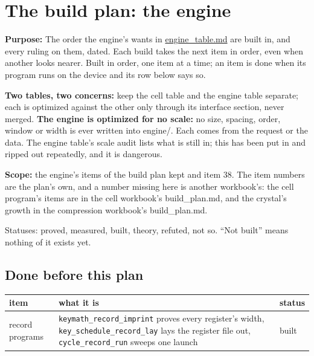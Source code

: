 \chapter{\texorpdfstring{The build plan: the engine}{The build plan: the engine}}
\label{chap:build-plan}

\textbf{Purpose:} The order the engine's wants in \hyperref[chap:engine-table]{engine\_\allowbreak{}table.md} are built in, and every ruling on them, dated. Each build takes the next item in order, even when another looks nearer. Built in order, one item at a time; an item is done when its program runs on the device and its row below says so.

\textbf{Two tables, two concerns:} keep the cell table and the engine table separate; each is optimized against the other only through its interface section, never merged. \textbf{The engine is optimized for no scale:} no size, spacing, order, window or width is ever written into engine/. Each comes from the request or the data. The engine table's scale audit lists what is still in; this has been put in and ripped out repeatedly, and it is dangerous.

\textbf{Scope:} the engine's items of the build plan kept and item 38. The item numbers are the plan's own, and a number missing here is another workbook's: the cell program's items are in the cell workbook's build\_\allowbreak{}plan.md, and the crystal's growth in the compression workbook's build\_\allowbreak{}plan.md.

Statuses: proved, measured, built, theory, refuted, not so. “Not built” means nothing of it exists yet.

\section{\texorpdfstring{Done before this plan}{Done before this plan}}

{\small
\setlength{\tabcolsep}{6pt}
\begin{longtable}{>{\RaggedRight\arraybackslash}p{}>{\RaggedRight\arraybackslash}p{}>{\RaggedRight\arraybackslash}p{}}
\toprule
item & what it is & status \\
\midrule
\endhead
record programs & \texttt{keymath\_\allowbreak{}record\_\allowbreak{}imprint} proves every register's width, \texttt{key\_\allowbreak{}schedule\_\allowbreak{}record\_\allowbreak{}lay} lays the register file out, \texttt{cycle\_\allowbreak{}record\_\allowbreak{}run} sweeps one launch & built \\
\bottomrule
\end{longtable}
}


